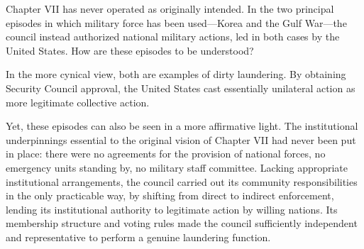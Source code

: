 Chapter VII has never operated as originally intended. In the two principal episodes in which military force has been used—Korea and the Gulf War—the council instead authorized national military actions, led in both cases by the United States. How are these episodes to be understood?

In the more cynical view, both are examples of dirty laundering. By obtaining Security Council approval, the United States cast essentially unilateral action as more legitimate collective action.

Yet, these episodes can also be seen in a more affirmative light. The institutional underpinnings essential to the original vision of Chapter VII had never been put in place: there were no agreements for the provision of national forces, no emergency units standing by, no military staff committee. Lacking appropriate institutional arrangements, the council carried out its community responsibilities in the only practicable way, by shifting from direct to indirect enforcement, lending its institutional authority to legitimate action by willing nations. Its membership structure and voting rules made the council sufficiently independent and representative to perform a genuine laundering function.
